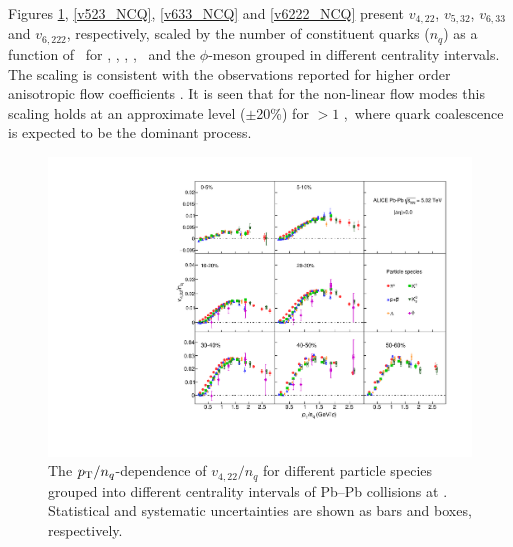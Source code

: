 Figures \ref{v422_NCQ}, \ref{v523_NCQ}, \ref{v633_NCQ} and \ref{v6222_NCQ} present $v_{4,22}$, $v_{5,32}$, $v_{6,33}$ and $v_{6,222}$, respectively, scaled by the number of constituent quarks ($n_{q}$) as a function of \pTnq~for \pion, \kaon, \Ks, \proton, \lambdas~and the $\phi$-meson grouped in different centrality intervals. The scaling is consistent with the observations reported for higher order anisotropic flow coefficients \cite{Acharya:2018zuq}. It is seen that for the non-linear flow modes this scaling holds at an approximate level ($\pm$20\%) for \pT $> 1$ \GeVc,~where quark coalescence is expected to be the dominant process.

\begin{figure}[!htb]
\begin{center}
\includegraphics[scale=0.82]{figures/scaling/All_v422_gap00_NCQ_3by3.pdf}
\end{center}
\caption{The $p_{\rm{T}}/n_{q}$-dependence of $v_{4,22}/n_{q}$ for different particle species grouped into different centrality intervals of Pb--Pb collisions at \sNN. Statistical and systematic uncertainties are shown as bars and boxes, respectively.}
\label{v422_NCQ}
\end{figure}

